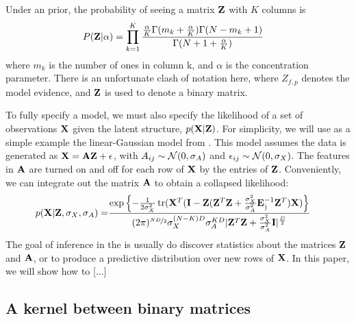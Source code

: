 Under an \ibp{} prior, the probability of seeing a matrix $\mathbf{Z}$ with $K$ columns is
%
\begin{align}
P(\mathbf{Z}|\alpha) & = \prod_{k=1}^K \frac{ \frac{ \alpha}{K} \Gamma(m_k + \frac{\alpha}{K}) \Gamma(N - m_k + 1)}{ \Gamma( N + 1 + \frac{\alpha}{K} ) }
\label{eq:IBP_prior}
\end{align}
%
where $m_k$ is the number of ones in column k, and $\alpha$ is the concentration parameter.  There is an unfortunate clash of notation here, where $Z_{f,p}$ denotes the model evidence, and $\mathbf{Z}$ is used to denote a binary matrix.

To fully specify a model, we must also specify the likelihood of a set of observations $\mathbf{X}$ given the latent structure, $p(\mathbf{X}|\mathbf{Z})$.
For simplicity, we will use as a simple example the linear-Gaussian model from \cite{griffiths2005infinite}.  This model assumes the data is generated as $\mathbf{X} = {\bf{A}} \mathbf{Z} + {\bf{\epsilon}}$, with $A_{ij} \sim \mathcal{N}\!\left(0,\sigma_A\right)$ and ${\bf{\epsilon}}_{ij} \sim \mathcal{N}\!\left(0,\sigma_X\right)$.  The features in ${\bf{A}}$ are turned on and off for each row of $\mathbf{X}$ by the entries of $\mathbf{Z}$.   Conveniently, we can integrate out the matrix ${\bf{A}}$ to obtain a collapsed likelihood:
\begin{align}
p(\mathbf{X} | \mathbf{Z}, \sigma_X, \sigma_A) = & \frac{\exp \left\{ - \frac{1}{2\sigma^2_X} \operatorname{tr} ( \mathbf{X}^T ( \mathbf{I} - \mathbf{Z} ( \mathbf{Z}^T \mathbf{Z} + \frac{\sigma^2_X}{\sigma^2_A} \mathbf{E}_{)}^{-1} \mathbf{Z}^T ) \mathbf{X} ) \right\}}{(2\pi)^{\nicefrac{ND}{2}} \sigma_X^{(N-K)D} \sigma_A^{KD} | \mathbf{Z}^T \mathbf{Z} + \frac{\sigma_X^2}{\sigma_A^2} \mathbf{I} |^\frac{D}{2}}
\label{eq:ibp_likelihood}
\end{align}
%
The goal of inference in the \ibp{} is usually do discover statistics about the matrices $\mathbf{Z}$ and ${\bf{A}}$, or to produce a predictive distribution over new rows of $\mathbf{X}$.  In this paper, we will show how to [...]

\subsection{A kernel between binary matrices}

